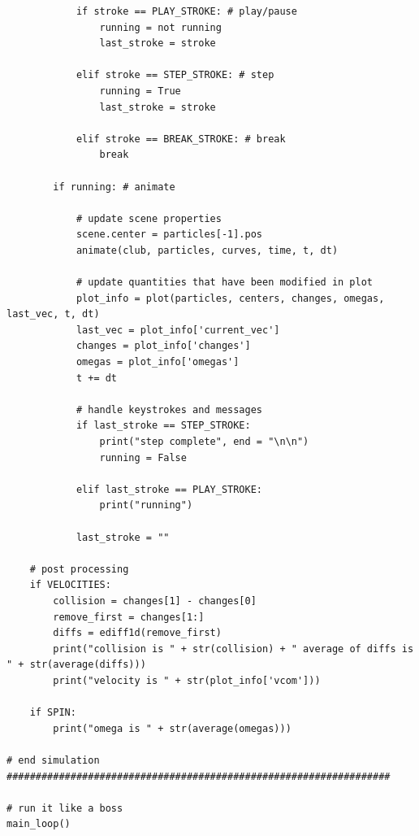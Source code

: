 \documentclass{article}
\begin{document}
\begin{verbatim}
            if stroke == PLAY_STROKE: # play/pause
                running = not running
                last_stroke = stroke
                
            elif stroke == STEP_STROKE: # step
                running = True
                last_stroke = stroke
                
            elif stroke == BREAK_STROKE: # break
                break

        if running: # animate

            # update scene properties
            scene.center = particles[-1].pos
            animate(club, particles, curves, time, t, dt)

            # update quantities that have been modified in plot
            plot_info = plot(particles, centers, changes, omegas, last_vec, t, dt)
            last_vec = plot_info['current_vec']
            changes = plot_info['changes']
            omegas = plot_info['omegas']
            t += dt

            # handle keystrokes and messages
            if last_stroke == STEP_STROKE:
                print("step complete", end = "\n\n")
                running = False

            elif last_stroke == PLAY_STROKE:
                print("running")

            last_stroke = ""

    # post processing
    if VELOCITIES:
        collision = changes[1] - changes[0]
        remove_first = changes[1:]        
        diffs = ediff1d(remove_first)
        print("collision is " + str(collision) + " average of diffs is " + str(average(diffs)))
        print("velocity is " + str(plot_info['vcom']))

    if SPIN:
        print("omega is " + str(average(omegas)))

# end simulation
##################################################################

# run it like a boss
main_loop()
\end{verbatim}



\end{document}
